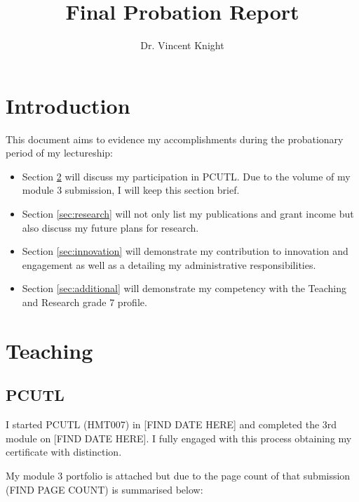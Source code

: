 \documentclass{article}
\title{Final Probation Report}
\author{Dr. Vincent Knight}
\begin{document}
\maketitle

\section{Introduction}\label{sec:introduction}

This document aims to evidence my accomplishments during the probationary period of my lectureship:

\begin{itemize}
    \item Section \ref{sec:teaching} will discuss my participation in PCUTL.
    Due to the volume of my module 3 submission, I will keep this section brief.
    \item Section \ref{sec:research} will not only list my publications and grant income but also discuss my future plans for research.
    \item Section \ref{sec:innovation} will demonstrate my contribution to innovation and engagement as well as a detailing my administrative responsibilities.
    \item Section \ref{sec:additional} will demonstrate my competency with the Teaching and Research grade 7 profile.
\end{itemize}

\section{Teaching}\label{sec:teaching}

\subsection{PCUTL}

I started PCUTL (HMT007) in [FIND DATE HERE] and completed the 3rd module on [FIND DATE HERE]. I fully engaged with this process obtaining my certificate with distinction.

My module 3 portfolio is attached but due to the page count of that submission (FIND PAGE COUNT) is summarised below:
\end{document}
